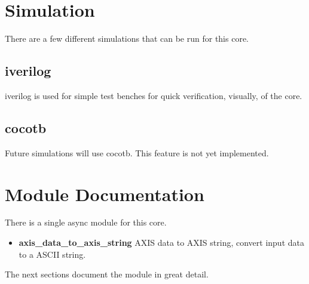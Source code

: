 \newpage

\section{Simulation}
\par
There are a few different simulations that can be run for this core.

\subsection{iverilog}
\par
iverilog is used for simple test benches for quick verification, visually, of the core.

\subsection{cocotb}
\par
Future simulations will use cocotb. This feature is not yet implemented.

\newpage

\section{Module Documentation} \label{Module Documentation}

\par
There is a single async module for this core.

\begin{itemize}
\item \textbf{axis\_data\_to\_axis\_string} AXIS data to AXIS string, convert input data to a ASCII string.\\
\end{itemize}
The next sections document the module in great detail.

